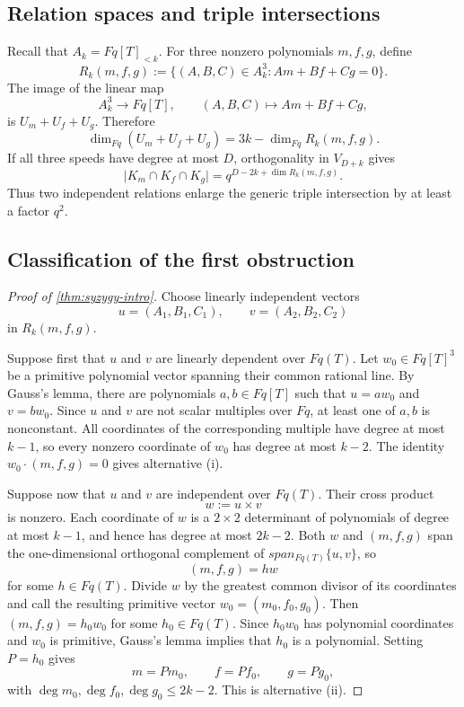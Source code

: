 \documentclass[11pt,reqno]{amsart}
\numberwithin{equation}{section}
\theoremstyle{definition}
\theoremstyle{remark}
\newcommand{\Fq}{\mathbb F_q}
\newcommand{\cR}{\mathcal R}
\newcommand{\abs}[1]{\lvert#1\rvert}
\newcommand{\set}[1]{\{#1\}}
\def\Fq{Fq}%
\def\mathbb#1{#1}%
\def\mathcal#1{#1}%
\def\operatorname#1{#1}%
\begin{document}
\subsection{Relation spaces and triple intersections}

Recall that $A_k=\Fq[T]_{<k}$.  For three nonzero polynomials $m,f,g$, define
\begin{equation}\label{eq:Rk-def}
 \cR_k(m,f,g)
 :=\set{(A,B,C)\in A_k^3:Am+Bf+Cg=0}.
\end{equation}
The image of the linear map
\[
 A_k^3\longrightarrow\Fq[T],
 \qquad
 (A,B,C)\longmapsto Am+Bf+Cg,
\]
is $U_m+U_f+U_g$.  Therefore
\begin{equation}\label{eq:rank-relation}
 \dim_{\Fq}(U_m+U_f+U_g)
 =3k-\dim_{\Fq}\cR_k(m,f,g).
\end{equation}
If all three speeds have degree at most $D$, orthogonality in
$V_{D+k}$ gives
\begin{equation}\label{eq:triple-intersection}
 \abs{K_m\cap K_f\cap K_g}
 =q^{D-2k+\dim\cR_k(m,f,g)}.
\end{equation}
Thus two independent relations enlarge the generic triple intersection by at least a factor $q^2$.

\subsection{Classification of the first obstruction}

\begin{proof}[Proof of \cref{thm:syzygy-intro}]
Choose linearly independent vectors
\[
 u=(A_1,B_1,C_1),
 \qquad
 v=(A_2,B_2,C_2)
\]
in $\cR_k(m,f,g)$.

Suppose first that $u$ and $v$ are linearly dependent over
$\Fq(T)$.  Let
$w_0\in\Fq[T]^3$ be a primitive polynomial vector spanning their common rational line.  By Gauss's lemma, there are polynomials
$a,b\in\Fq[T]$ such that
$u=aw_0$ and $v=bw_0$.  Since $u$ and $v$ are not scalar multiples over $\Fq$, at least one of $a,b$ is nonconstant.  All coordinates of the corresponding multiple have degree at most $k-1$, so every nonzero coordinate of $w_0$ has degree at most $k-2$.  The identity
$w_0\cdot(m,f,g)=0$ gives alternative \textup{(i)}.

Suppose now that $u$ and $v$ are independent over $\Fq(T)$.  Their cross product
\[
 w:=u\times v
\]
is nonzero.  Each coordinate of $w$ is a $2\times2$ determinant of polynomials of degree at most $k-1$, and hence has degree at most $2k-2$.  Both $w$ and $(m,f,g)$ span the one-dimensional orthogonal complement of
$\operatorname{span}_{\Fq(T)}\{u,v\}$, so
\[
 (m,f,g)=h w
\]
for some $h\in\Fq(T)$.  Divide $w$ by the greatest common divisor of its coordinates and call the resulting primitive vector $w_0=(m_0,f_0,g_0)$.  Then
$(m,f,g)=h_0w_0$ for some $h_0\in\Fq(T)$.  Since $h_0w_0$ has polynomial coordinates and $w_0$ is primitive, Gauss's lemma implies that $h_0$ is a polynomial.  Setting $P=h_0$ gives
\[
 m=Pm_0,
 \qquad
 f=Pf_0,
 \qquad
 g=Pg_0,
\]
with $\deg m_0,\deg f_0,\deg g_0\le2k-2$.  This is alternative \textup{(ii)}.
\end{proof}
\end{document}
